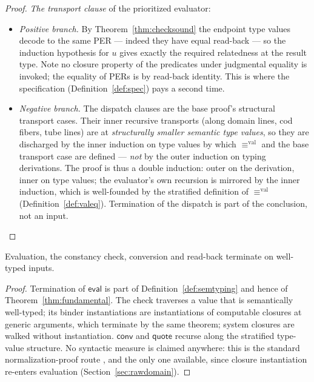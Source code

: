 \documentclass{lmcs}
\newcommand{\valeq}{\equiv^{\mathrm{val}}}
\newcommand{\evalop}{\mathsf{eval}}
\newcommand{\convop}{\mathsf{conv}}
\newcommand{\quo}{\mathsf{quote}}
\begin{document}
\begin{proof}
  \emph{The transport clause} of the prioritized evaluator:
  \begin{itemize}
  \item \emph{Positive branch.}  By Theorem~\ref{thm:checksound} the
    endpoint type values decode to the same PER --- indeed they have
    equal read-back --- so the induction hypothesis for $u$ gives
    exactly the required relatedness at the result type.  Note no
    closure property of the predicates under judgmental equality is
    invoked; the equality of PERs is by read-back identity.  This is
    where the specification (Definition~\ref{def:spec}) pays a
    second time.
  \item \emph{Negative branch.}  The dispatch clauses are the base
    proof's structural transport cases.  Their inner recursive
    transports (along domain lines, cod fibers, tube lines) are at
    \emph{structurally smaller semantic type values}, so they are
    discharged by the inner induction on type values by which
    $\valeq$ and the base transport case are defined --- \emph{not}
    by the outer induction on typing derivations.  The proof is thus
    a double induction: outer on the derivation, inner on type
    values; the evaluator's own recursion is mirrored by the inner
    induction, which is well-founded by the stratified definition of
    $\valeq$ (Definition~\ref{def:valeq}).  Termination of the
    dispatch is part of the conclusion, not an input.
  \end{itemize}
\end{proof}

\begin{cor}[Termination]\label{cor:termination}
  Evaluation, the constancy check, conversion and read-back
  terminate on well-typed inputs.
\end{cor}
\begin{proof}
  Termination of $\evalop$ is part of
  Definition~\ref{def:semtyping} and hence of
  Theorem~\ref{thm:fundamental}.  The check traverses a value that is
  semantically well-typed; its binder instantiations are
  instantiations of computable closures at generic arguments, which
  terminate by the same theorem; system closures are walked without
  instantiation.  $\convop$ and $\quo$ recurse along the stratified
  type-value structure.  No syntactic measure is claimed anywhere:
  this is the standard normalization-proof route
  \cite{HuberNorm,SterlingAngiuli}, and the only one available, since
  closure instantiation re-enters evaluation
  (Section~\ref{sec:rawdomain}).
\end{proof}
\end{document}
